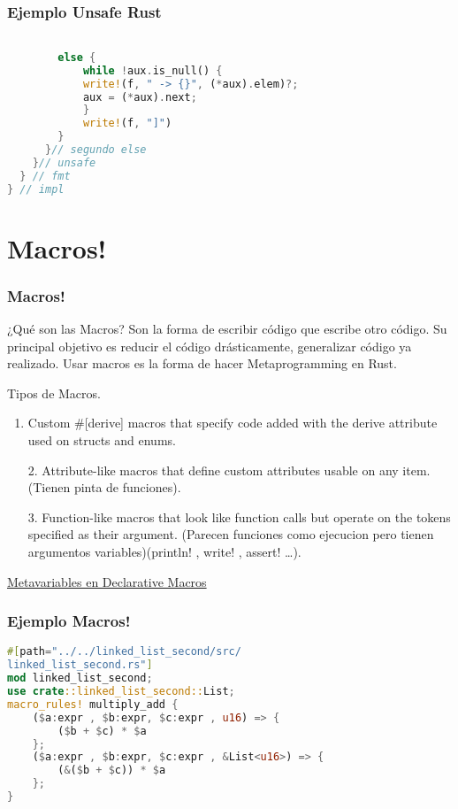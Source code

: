 \documentclass{beamer}
\begin{document}
\begin{frame}[fragile]
  \frametitle{Ejemplo Unsafe Rust}
  \begin{lstlisting}[language=Rust , style=boxed]

        else {
            while !aux.is_null() {
            write!(f, " -> {}", (*aux).elem)?;
            aux = (*aux).next;
            }
            write!(f, "]")
        }
      }// segundo else
    }// unsafe
  } // fmt
} // impl\end{lstlisting}
\end{frame}


\section{Macros!}
\begin{frame}
  \frametitle{Macros!}
  \begin{block}{¿Qué son las Macros?}
  Son la forma de escribir código que escribe otro código. Su principal objetivo es reducir el código drásticamente, generalizar código ya realizado. Usar macros es la forma de hacer Metaprogramming en Rust.  
  \end{block}
  \pause
  \bigbreak
  Tipos de Macros.
  \begin{enumerate}[1.]
    \item Custom \#[derive] macros that specify code added with the derive attribute used on structs and enums.
    \pause
    \item [2.] Attribute-like macros that define custom attributes usable on any item. (Tienen pinta de funciones).
    \pause
    \item [3.] Function-like macros that look like function calls but operate on the tokens specified as their argument. (Parecen funciones como ejecucion pero tienen argumentos variables)(println! , write! , assert! \dots).
  \end{enumerate}
  \href{https://veykril.github.io/tlborm/decl-macros/macro_rules.html\#metavariables}{Metavariables en Declarative Macros}
\end{frame}


\begin{frame}[fragile]
  \frametitle{Ejemplo Macros!}
  \begin{lstlisting}[language=Rust , style=boxed]
#[path="../../linked_list_second/src/
linked_list_second.rs"]
mod linked_list_second;
use crate::linked_list_second::List;
macro_rules! multiply_add {
    ($a:expr , $b:expr, $c:expr , u16) => {
        ($b + $c) * $a
    };
    ($a:expr , $b:expr, $c:expr , &List<u16>) => {
        (&($b + $c)) * $a
    };
}\end{lstlisting}
\end{frame}
\end{document}

